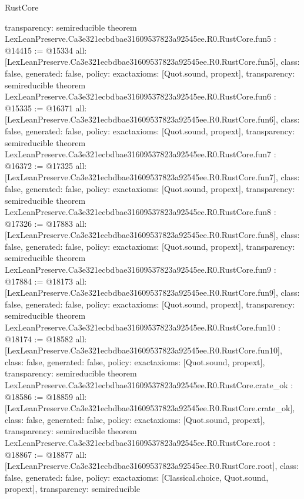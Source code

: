 \begin{lexlean}{RustCore}
\begin{coremodule}
{  transparency: semireducible
}
theorem LexLeanPreserve.Ca3e321ecbdbae31609537823a92545ee.R0.RustCore.fun5 : @14415 := @15334 {
  all: [LexLeanPreserve.Ca3e321ecbdbae31609537823a92545ee.R0.RustCore.fun5],
  class: false,
  generated: false,
  policy: exact{axioms: [Quot.sound, propext]},
  transparency: semireducible
}
theorem LexLeanPreserve.Ca3e321ecbdbae31609537823a92545ee.R0.RustCore.fun6 : @15335 := @16371 {
  all: [LexLeanPreserve.Ca3e321ecbdbae31609537823a92545ee.R0.RustCore.fun6],
  class: false,
  generated: false,
  policy: exact{axioms: [Quot.sound, propext]},
  transparency: semireducible
}
theorem LexLeanPreserve.Ca3e321ecbdbae31609537823a92545ee.R0.RustCore.fun7 : @16372 := @17325 {
  all: [LexLeanPreserve.Ca3e321ecbdbae31609537823a92545ee.R0.RustCore.fun7],
  class: false,
  generated: false,
  policy: exact{axioms: [Quot.sound, propext]},
  transparency: semireducible
}
theorem LexLeanPreserve.Ca3e321ecbdbae31609537823a92545ee.R0.RustCore.fun8 : @17326 := @17883 {
  all: [LexLeanPreserve.Ca3e321ecbdbae31609537823a92545ee.R0.RustCore.fun8],
  class: false,
  generated: false,
  policy: exact{axioms: [Quot.sound, propext]},
  transparency: semireducible
}
theorem LexLeanPreserve.Ca3e321ecbdbae31609537823a92545ee.R0.RustCore.fun9 : @17884 := @18173 {
  all: [LexLeanPreserve.Ca3e321ecbdbae31609537823a92545ee.R0.RustCore.fun9],
  class: false,
  generated: false,
  policy: exact{axioms: [Quot.sound, propext]},
  transparency: semireducible
}
theorem LexLeanPreserve.Ca3e321ecbdbae31609537823a92545ee.R0.RustCore.fun10 : @18174 := @18582 {
  all: [LexLeanPreserve.Ca3e321ecbdbae31609537823a92545ee.R0.RustCore.fun10],
  class: false,
  generated: false,
  policy: exact{axioms: [Quot.sound, propext]},
  transparency: semireducible
}
theorem LexLeanPreserve.Ca3e321ecbdbae31609537823a92545ee.R0.RustCore.crate_ok : @18586 := @18859 {
  all: [LexLeanPreserve.Ca3e321ecbdbae31609537823a92545ee.R0.RustCore.crate_ok],
  class: false,
  generated: false,
  policy: exact{axioms: [Quot.sound, propext]},
  transparency: semireducible
}
theorem LexLeanPreserve.Ca3e321ecbdbae31609537823a92545ee.R0.RustCore.root : @18867 := @18877 {
  all: [LexLeanPreserve.Ca3e321ecbdbae31609537823a92545ee.R0.RustCore.root],
  class: false,
  generated: false,
  policy: exact{axioms: [Classical.choice, Quot.sound, propext]},
  transparency: semireducible
}


\end{coremodule}
\end{lexlean}
